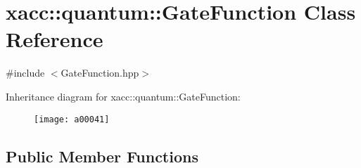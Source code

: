 \hypertarget{a00041}{}\section{xacc\+:\+:quantum\+:\+:Gate\+Function Class Reference}
\label{a00041}


{\ttfamily \#include $<$Gate\+Function.\+hpp$>$}

Inheritance diagram for xacc\+:\+:quantum\+:\+:Gate\+Function\+:\begin{figure}[H]
\begin{center}
\leavevmode
\texttt{[image: a00041]}
\end{center}
\end{figure}
\subsection*{Public Member Functions}
